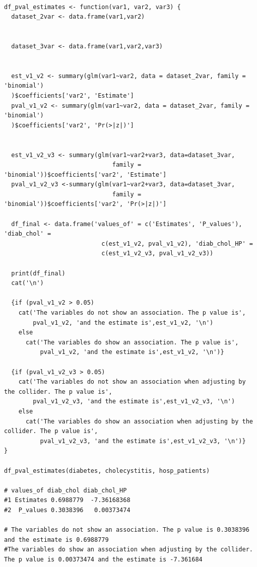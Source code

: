 \documentclass{article}
\begin{document}
\begin{lstlisting}

df_pval_estimates <- function(var1, var2, var3) {
  dataset_2var <- data.frame(var1,var2)
  
  
  dataset_3var <- data.frame(var1,var2,var3)
  
  
  est_v1_v2 <- summary(glm(var1~var2, data = dataset_2var, family = 'binomial')
  )$coefficients['var2', 'Estimate']
  pval_v1_v2 <- summary(glm(var1~var2, data = dataset_2var, family = 'binomial')
  )$coefficients['var2', 'Pr(>|z|)']
  
  
  est_v1_v2_v3 <- summary(glm(var1~var2+var3, data=dataset_3var, 
                              family = 'binomial'))$coefficients['var2', 'Estimate']
  pval_v1_v2_v3 <-summary(glm(var1~var2+var3, data=dataset_3var, 
                              family = 'binomial'))$coefficients['var2', 'Pr(>|z|)']
  
  df_final <- data.frame('values_of' = c('Estimates', 'P_values'), 'diab_chol' = 
                           c(est_v1_v2, pval_v1_v2), 'diab_chol_HP' = 
                           c(est_v1_v2_v3, pval_v1_v2_v3))
  
  print(df_final)
  cat('\n')
  
  {if (pval_v1_v2 > 0.05)
    cat('The variables do not show an association. The p value is', 
        pval_v1_v2, 'and the estimate is',est_v1_v2, '\n')
    else
      cat('The variables do show an association. The p value is', 
          pval_v1_v2, 'and the estimate is',est_v1_v2, '\n')}
  
  {if (pval_v1_v2_v3 > 0.05)
    cat('The variables do not show an association when adjusting by the collider. The p value is', 
        pval_v1_v2_v3, 'and the estimate is',est_v1_v2_v3, '\n')
    else
      cat('The variables do show an association when adjusting by the collider. The p value is', 
          pval_v1_v2_v3, 'and the estimate is',est_v1_v2_v3, '\n')}
}

df_pval_estimates(diabetes, cholecystitis, hosp_patients)

# values_of diab_chol diab_chol_HP
#1 Estimates 0.6988779  -7.36168368
#2  P_values 0.3038396   0.00373474

# The variables do not show an association. The p value is 0.3038396 and the estimate is 0.6988779 
#The variables do show an association when adjusting by the collider. The p value is 0.00373474 and the estimate is -7.361684

\end{lstlisting}
\end{document}
